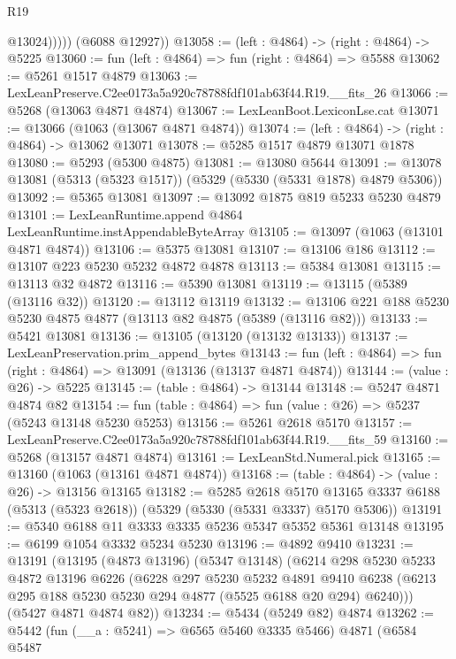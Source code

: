 \begin{lexlean}{R19}
\begin{coremodule}
                @13024)))))
      (@6088 @12927))
@13058 := (left : @4864) -> (right : @4864) -> @5225
@13060 := fun (left : @4864) => fun (right : @4864) => @5588
@13062 := @5261 @1517 @4879
@13063 := LexLeanPreserve.C2ee0173a5a920c78788fdf101ab63f44.R19.__fits_26
@13066 := @5268 (@13063 @4871 @4874)
@13067 := LexLeanBoot.LexiconLse.cat
@13071 := @13066 (@1063 (@13067 @4871 @4874))
@13074 := (left : @4864) -> (right : @4864) -> @13062 @13071
@13078 := @5285 @1517 @4879 @13071 @1878
@13080 := @5293 (@5300 @4875)
@13081 := @13080 @5644
@13091 := @13078 @13081 (@5313 (@5323 @1517)) (@5329 (@5330 (@5331 @1878) @4879 @5306))
@13092 := @5365 @13081
@13097 := @13092 @1875 @819 @5233 @5230 @4879
@13101 := LexLeanRuntime.append @4864 LexLeanRuntime.instAppendableByteArray
@13105 := @13097 (@1063 (@13101 @4871 @4874))
@13106 := @5375 @13081
@13107 := @13106 @186
@13112 := @13107 @223 @5230 @5232 @4872 @4878
@13113 := @5384 @13081
@13115 := @13113 @32 @4872
@13116 := @5390 @13081
@13119 := @13115 (@5389 (@13116 @32))
@13120 := @13112 @13119
@13132 := @13106 @221 @188 @5230 @5230 @4875 @4877 (@13113 @82 @4875 (@5389 (@13116 @82)))
@13133 := @5421 @13081
@13136 := @13105 (@13120 (@13132 @13133))
@13137 := LexLeanPreservation.prim_append_bytes
@13143 := fun (left : @4864) => fun (right : @4864) => @13091 (@13136 (@13137 @4871 @4874))
@13144 := (value : @26) -> @5225
@13145 := (table : @4864) -> @13144
@13148 := @5247 @4871 @4874 @82
@13154 := fun (table : @4864) => fun (value : @26) => @5237 (@5243 @13148 @5230 @5253)
@13156 := @5261 @2618 @5170
@13157 := LexLeanPreserve.C2ee0173a5a920c78788fdf101ab63f44.R19.__fits_59
@13160 := @5268 (@13157 @4871 @4874)
@13161 := LexLeanStd.Numeral.pick
@13165 := @13160 (@1063 (@13161 @4871 @4874))
@13168 := (table : @4864) -> (value : @26) -> @13156 @13165
@13182 := @5285
    @2618
    @5170
    @13165
    @3337
    @6188
    (@5313 (@5323 @2618))
    (@5329 (@5330 (@5331 @3337) @5170 @5306))
@13191 := @5340 @6188 @11 @3333 @3335 @5236 @5347 @5352 @5361 @13148
@13195 := @6199 @1054 @3332 @5234 @5230
@13196 := @4892 @9410
@13231 := @13191
    (@13195
      (@4873 @13196)
      (@5347 @13148)
      (@6214
        @298
        @5230
        @5233
        @4872
        @13196
        @6226
        (@6228
          @297
          @5230
          @5232
          @4891
          @9410
          @6238
          (@6213 @295 @188 @5230 @5230 @294 @4877 (@5525 @6188 @20 @294) @6240)))
      (@5427 @4871 @4874 @82))
@13234 := @5434 (@5249 @82) @4874
@13262 := @5442
    (fun (__a : @5241) => @6565 @5460 @3335 @5466)
    @4871
    (@6584
      @5487

\end{coremodule}
\end{lexlean}
